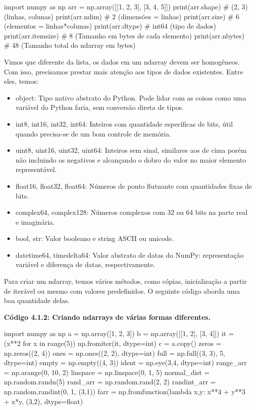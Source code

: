 \documentclass[11pt, a4paper]{article}
\begin{document}
\begin{code}
import numpy as np
arr = np.array([[1, 2, 3], [3, 4, 5]])
print(arr.shape) # (2, 3)  (linhas, colunas)
print(arr.ndim) # 2 (dimensões = linhas)
print(arr.size) # 6 (elementos = linhas*colunas)
print(arr.dtype) # int64 (tipo de dados)
print(arr.itemsize) # 8 (Tamanho em bytes de cada elemento)
print(arr.nbytes) # 48 (Tamanho total do ndarray em bytes)
\end{code}

Vimos que diferente da lista, os dados em um ndarray devem ser homogêneos. Com isso, precisamos prestar mais atenção aos tipos de dados existentes. Entre eles, temos:

\begin{itemize}
    \item object: Tipo nativo abstrato do Python. Pode lidar com as coisas como uma variável do Python faria, sem conversão direta de tipos.
    \item int8, int16, int32, int64: Inteiros com quantidade específicas de bits, útil quando precisa-se de um bom controle de memória.
    \item uint8, uint16, uint32, uint64: Inteiros sem sinal, similares aos de cima porém não incluindo os negativos e alcançando o dobro do valor no maior elemento representável.
    \item float16, float32, float64: Números de ponto flutuante com quantidades fixas de bits.
    \item complex64, complex128: Números complexos com 32 ou 64 bits na parte real e imaginária.
    \item bool, str: Valor booleano e string ASCII ou unicode.
    \item datetime64, timedelta64: Valor abstrato de datas do NumPy: representação variável e diferença de datas, respectivamente.
\end{itemize}

Para criar um ndarray, temos vários métodos, como cópias, inicialização a partir de iterável ou mesmo com valores predefinidos. O seguinte código aborda uma boa quantidade delas.

\textbf{Código 4.1.2: Criando ndarrays de várias formas diferentes.}

\begin{code}
import numpy as np
a = np.array([1, 2, 3])
b = np.array([[1, 2], [3, 4]])
it = (x**2 for x in range(5))
np.fromiter(it, dtype=int)
c = a.copy()
zeros = np.zeros((2, 4))
ones = np.ones((2, 2), dtype=int)
full = np.full((3, 3), 5, dtype=int)
empty = np.empty((4, 3))
ident = np.eye(3,4, dtype=int)
range_arr = np.arange(0, 10, 2)
linspace = np.linspace(0, 1, 5)
normal_dist = np.random.randn(5)
rand_arr = np.random.rand(2, 2)
randint_arr = np.random.randint(0, 1, (3,1))
farr = np.fromfunction(lambda x,y: x**4 + y**3 + x*y, (3,2), dtype=float)
\end{code}
\end{document}
